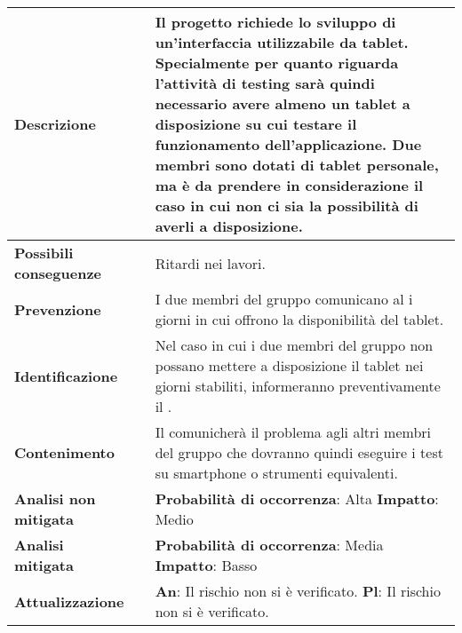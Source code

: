 		
					\small
					\begin{table}[H]
					\begin{center}			
					\begin{tabular}{p{2.5cm}p{0.5cm}p{11cm}}
					\arrayrulecolor{lightgray}
					
					\toprule				
						\textbf{Descrizione}
						& &
						Il progetto richiede lo sviluppo di un'interfaccia utilizzabile da tablet. Specialmente per quanto riguarda l'attività di testing sarà quindi necessario avere almeno un tablet a disposizione su cui testare il funzionamento dell'applicazione. Due membri sono dotati di tablet personale, ma è da prendere in considerazione il caso in cui non ci sia la possibilità di averli a disposizione.
					\\
					\midrule
						\textbf{Possibili \newline conseguenze}
						& &
						Ritardi nei lavori.
					\\
					\midrule
						\textbf{Prevenzione}
						& &
						I due membri del gruppo comunicano al \responsabilediprogetto{} i giorni in cui offrono la disponibilità del tablet.
					\\
					\midrule
						\textbf{Identificazione}
						& &
						Nel caso in cui i due membri del gruppo non possano mettere a disposizione il tablet nei giorni stabiliti, informeranno preventivamente il \responsabilediprogetto{}.
					\\
					\midrule
						\textbf{Contenimento}
						& &
						Il \responsabilediprogetto{} comunicherà il problema agli altri membri del gruppo che dovranno quindi eseguire i test su smartphone o strumenti equivalenti.
					\\
					\midrule
						\textbf{Analisi \newline non mitigata}
						& &
						\textbf{Probabilità di occorrenza}: Alta
						\newline
						\textbf{Impatto}: Medio
					\\
					\midrule
						\textbf{Analisi \newline mitigata}
						& &
						\textbf{Probabilità di occorrenza}: Media
						\newline
						\textbf{Impatto}: Basso
					\\
					\midrule
						\textbf{Attualizzazione}
						& &
						\textbf{An}: Il rischio non si è verificato.
						\newline
						\textbf{Pl}: Il rischio non si è verificato.
					\\
					
					\bottomrule	
					\end{tabular}
					\end{center}
					\end{table}			
	
